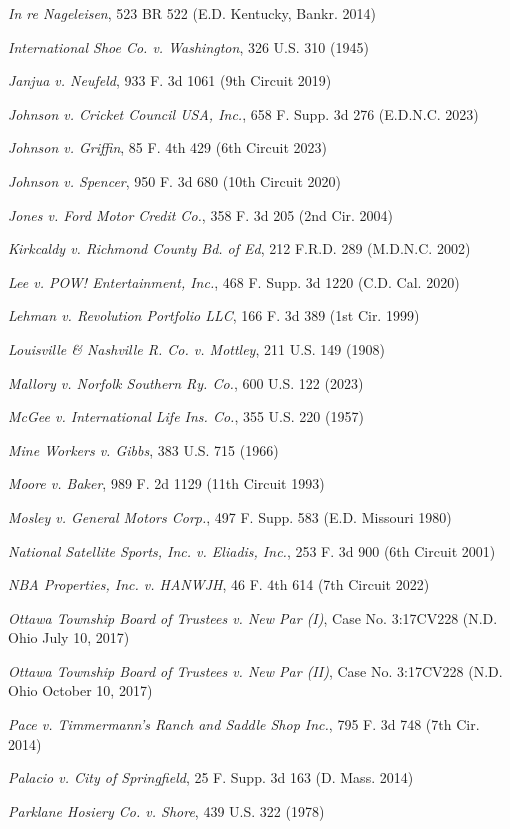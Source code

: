 \textit{In re Nageleisen}, 523 BR 522 (E.D. Kentucky, Bankr. 2014)

\textit{International Shoe Co. v. Washington}, 326 U.S. 310 (1945)

\textit{Janjua v. Neufeld}, 933 F. 3d 1061 (9th Circuit 2019)

\textit{Johnson v. Cricket Council USA, Inc.}, 658 F. Supp. 3d 276 (E.D.N.C. 2023)

\textit{Johnson v. Griffin}, 85 F. 4th 429 (6th Circuit 2023)

\textit{Johnson v. Spencer}, 950 F. 3d 680 (10th Circuit 2020)

\textit{Jones v. Ford Motor Credit Co.}, 358 F. 3d 205 (2nd Cir. 2004)

\textit{Kirkcaldy v. Richmond County Bd. of Ed}, 212 F.R.D. 289 (M.D.N.C. 2002)

\textit{Lee v. POW! Entertainment, Inc.}, 468 F. Supp. 3d 1220 (C.D. Cal. 2020)

\textit{Lehman v. Revolution Portfolio LLC}, 166 F. 3d 389 (1st Cir. 1999)

\textit{Louisville \& Nashville R. Co. v. Mottley}, 211 U.S. 149 (1908)

\textit{Mallory v. Norfolk Southern Ry. Co.}, 600 U.S. 122 (2023)

\textit{McGee v. International Life Ins. Co.}, 355 U.S. 220 (1957)

\textit{Mine Workers v. Gibbs}, 383 U.S. 715 (1966)

\textit{Moore v. Baker}, 989 F. 2d 1129 (11th Circuit 1993)

\textit{Mosley v. General Motors Corp.}, 497 F. Supp. 583 (E.D. Missouri 1980)

\textit{National Satellite Sports, Inc. v. Eliadis, Inc.}, 253 F. 3d 900 (6th Circuit 2001)

\textit{NBA Properties, Inc. v. HANWJH}, 46 F. 4th 614 (7th Circuit 2022)

\textit{Ottawa Township Board of Trustees v. New Par (I)}, Case No. 3:17CV228 (N.D. Ohio July 10, 2017)

\textit{Ottawa Township Board of Trustees v. New Par (II)}, Case No. 3:17CV228 (N.D. Ohio October 10, 2017)

\textit{Pace v. Timmermann’s Ranch and Saddle Shop Inc.}, 795 F. 3d 748 (7th Cir. 2014)

\textit{Palacio v. City of Springfield}, 25 F. Supp. 3d 163 (D. Mass. 2014)

\textit{Parklane Hosiery Co. v. Shore}, 439 U.S. 322 (1978)

